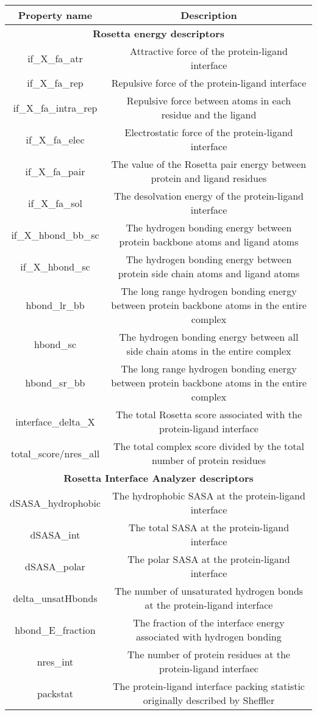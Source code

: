 \begin{tabular}{|c|c|}
\hline
\textbf{Property name} & \textbf{Description} \\
\hline
\multicolumn{2}{|c|}{\textbf{Rosetta energy descriptors}} \\
\hline
if\_X\_fa\_atr & Attractive force of the protein-ligand interface\\
\hline
if\_X\_fa\_rep & Repulsive force of the protein-ligand interface\\
\hline
if\_X\_fa\_intra\_rep & Repulsive force between atoms in each residue and the ligand \\
\hline
if\_X\_fa\_elec & Electrostatic force of the protein-ligand interface \\
\hline
if\_X\_fa\_pair & The value of the Rosetta pair energy between protein and ligand residues\\
\hline
if\_X\_fa\_sol & The desolvation energy of the protein-ligand interface \\
\hline
if\_X\_hbond\_bb\_sc & The hydrogen bonding energy between protein backbone atoms and ligand atoms \\
\hline
if\_X\_hbond\_sc & The hydrogen bonding energy between protein side chain atoms and ligand atoms \\
\hline
hbond\_lr\_bb & The long range hydrogen bonding energy between protein backbone atoms in the entire complex \\
\hline
hbond\_sc & The hydrogen bonding energy between all side chain atoms in the entire complex\\
\hline
hbond\_sr\_bb &  The long range hydrogen bonding energy between protein backbone atoms in the entire complex\\
\hline
interface\_delta\_X & The total Rosetta score associated with the protein-ligand interface\\
\hline
total\_score/nres\_all & The total complex score divided by the total number of protein residues \\
\hline
\multicolumn{2}{|c|}{\textbf{Rosetta Interface Analyzer descriptors}} \\
\hline
dSASA\_hydrophobic & The hydrophobic SASA at the protein-ligand interface  \\
\hline
dSASA\_int & The total SASA at the protein-ligand interface  \\
\hline
dSASA\_polar & The polar SASA at the protein-ligand interface \\
\hline
delta\_unsatHbonds & The number of unsaturated hydrogen bonds at the protein-ligand interface\\
\hline
hbond\_E\_fraction & The fraction of the interface energy associated with hydrogen bonding\\
\hline
nres\_int & The number of protein residues at the protein-ligand interfaec\\
\hline
packstat & The protein-ligand interface packing statistic originally described by Sheffler \citep{Sheffler:2009bd} \\
\hline
\end{tabular}